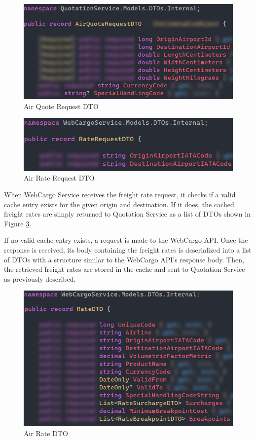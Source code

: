 \documentclass[12pt,reqno, oneside]{amsbook}
\theoremstyle{definition}
\theoremstyle{definition}
\numberwithin{section}{chapter}
\numberwithin{table}{chapter}
\numberwithin{figure}{chapter}
\begin{document}
\begin{figure}[H]
  \centering
  \includegraphics[width=0.9\linewidth]{images/AirQuoteRequestDTO.png}
  \caption{\label{Figure:AirQuoteRequestDTO}Air Quote Request DTO}
\end{figure}

\begin{figure}[H]
  \centering
  \includegraphics[width=0.9\linewidth]{images/AirRateRequestDTO.png}
  \caption{\label{Figure:AirRateRequestDTO}Air Rate Request DTO}
\end{figure}

When WebCargo Service receives the freight rate request, it checks if a valid cache entry exists for the given origin and destination. If it does, the cached freight rates are simply returned to Quotation Service as a list of \acp{DTO} shown in Figure \ref{Figure:AirRateDTO}.

If no valid cache entry exists, a request is made to the WebCargo \ac{API}. Once the response is received, its body containing the freight rates is deserialized into a list of \acp{DTO} with a structure similar to the WebCargo \ac{API}'s response body. Then, the retrieved freight rates are stored in the cache and sent to Quotation Service as previously described.

\begin{figure}[H]
  \centering
  \includegraphics[width=0.9\linewidth]{images/AirRateDTO.png}
  \caption{\label{Figure:AirRateDTO}Air Rate DTO}
\end{figure}
\end{document}
